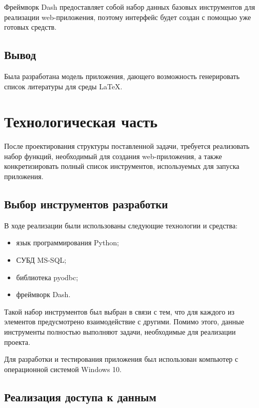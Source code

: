 Фреймворк Dash предоставляет собой набор данных базовых инструментов для реализации web-приложения, поэтому интерфейс будет создан с помощью уже готовых средств.

\subsection*{Вывод}%
Была разработана модель приложения, дающего возможность генерировать список литературы для среды LaTeX.


\newpage
\section*{Технологическая часть}%

После проектирования структуры поставленной задачи, требуется реализовать набор функций, необходимый для создания web-приложения, а также конкретизировать полный список инструментов, используемых для запуска приложения.

\subsection*{Выбор инструментов разработки}%

В ходе реализации были использованы следующие технологии и средства:

\begin{itemize}
	\item язык программирования Python;
	\item СУБД MS-SQL;
	\item библиотека pyodbc;
	\item фреймворк Dash.
\end{itemize}

Такой набор инструментов был выбран в связи с тем, что для каждого из элементов предусмотрено взаимодействие с другими. Помимо этого, данные инструменты полностью выполняют задачи, необходимые для реализации проекта.

Для разработки и тестирования приложения был использован компьютер с операционной системой Windows 10.

\subsection*{Реализация доступа к данным}%

